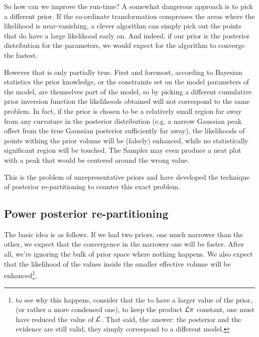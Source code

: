 \documentclass[usenatbib]{mnras}
\begin{document}
So how can we improve the run-time? A somewhat dangerous approach
is to pick a different prior. If the co-ordinate transformation
compresses the areas where the likelihood is near-vanishing, a
clever algorithm can simply pick out the points that do have a
large likelihood early on. And indeed, if our prior is the
posterior distribution for the parameters, we would expect for the
algorithm to converge the fastest.

However that is only partially true. First and foremost, according
to Bayesian statistics the prior knowledge, or the constraints set
on the model parameters of the model, are themselves part of the
model, so by picking a different cumulative prior inversion function the
likelihoods obtained will not correspond to the same problem. In
fact, if the prior is chosen to be a relatively small region far
away from any curvature in the posterior distribution (e.g. a
narrow Gaussian peak offset from the true Gaussian posterior
sufficiently far away), the likelihoods of points withing the prior
volume will be (falsely) enhanced, while no statistically
significant region will be touched. The Sampler may even produce a
neat plot with a peak that would be centered around the wrong
value.

This is the problem of unrepresentative priors and
\citeauthor*{chen-ferroz-hobson} have developed the technique of
posterior re-partitioning to counter this exact problem.


\subsection{Power posterior re-partitioning}
\label{sec:org69fb667}

The basic idea is as follows. If we had two priors, one much
narrower than the other, we expect that the convergence in the
narrower one will be faster. After all, we're ignoring the bulk of
prior space where nothing happens. We also expect that the
likelihood of the values inside the smaller effective volume will
be enhanced\footnote{to see why this happens, consider that the to   have a larger value of the prior, (or rather a more condensed one),   to keep the product \(\cal L \pi\) constant, one must have reduced   the value of \(\cal L\). That said, the answer: the posterior and   the evidence are still valid, they simply correspond to a different  model.}. 
\end{document}
